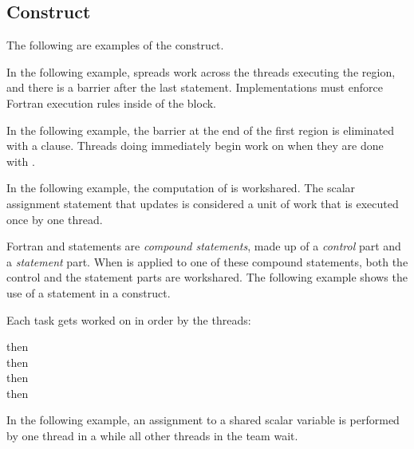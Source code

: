 \begin{fortranspecific}[4ex]
\section{ Construct}
\label{sec:workshare}

The following are examples of the  construct. 

In the following example,  spreads work across the threads executing 
the  region, and there is a barrier after the last statement. 
Implementations must enforce Fortran execution rules inside of the  
block.


In the following example, the barrier at the end of the first  
region is eliminated with a  clause. Threads doing  immediately begin work on  when they are done with .

\pagebreak
{}

In the following example, the computation of  is workshared. The
scalar assignment statement that updates  is considered a unit of work
that is executed once by one thread.


Fortran  and  statements are \emph{compound statements}, 
made up of a \emph{control} part and a \emph{statement} part. When  
is applied to one of these compound statements, both the control and the statement 
parts are workshared. The following example shows the use of a  statement 
in a  construct.

Each task gets worked on in order by the threads:

 then
\\
 then
\\
 then
\\
 then
\\


In the following example, an assignment to a shared scalar variable is performed 
by one thread in a  while all other threads in the team wait.


\end{fortranspecific}
